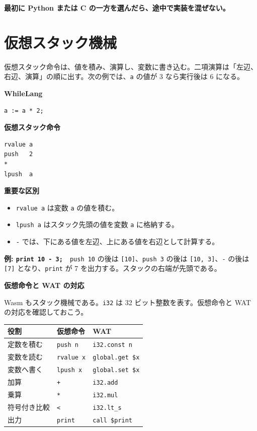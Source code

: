 \documentclass[a4paper,11pt]{ltjsarticle}
\begin{document}
\textbf{最初に Python または C の一方を選んだら、途中で実装を混ぜない。}

\section{仮想スタック機械}

仮想スタック命令は、値を積み、演算し、変数に書き込む。二項演算は「左辺、右辺、演算」の順に出す。次の例では、\texttt{a} の値が 3 なら実行後は 6 になる。

\begin{minipage}[t]{0.47\textwidth}
\textbf{WhileLang}
\begin{lstlisting}
a := a * 2;
\end{lstlisting}
\end{minipage}\hfill
\begin{minipage}[t]{0.49\textwidth}
\textbf{仮想スタック命令}
\begin{lstlisting}
rvalue a
push   2
*
lpush  a
\end{lstlisting}
\end{minipage}

\noindent\textbf{重要な区別}
\begin{itemize}
  \item \texttt{rvalue a} は変数 \texttt{a} の値を積む。
  \item \texttt{lpush a} はスタック先頭の値を変数 \texttt{a} に格納する。
  \item \texttt{-} では、下にある値を左辺、上にある値を右辺として計算する。
\end{itemize}

\noindent\textbf{例: \texttt{print 10 - 3;}}　\texttt{push 10} の後は \texttt{[10]}、\texttt{push 3} の後は \texttt{[10, 3]}、\texttt{-} の後は \texttt{[7]} となり、\texttt{print} が 7 を出力する。スタックの右端が先頭である。

\clearpage
\noindent\textbf{仮想命令と WAT の対応}

Wasm もスタック機械である。\texttt{i32} は 32 ビット整数を表す。仮想命令と WAT の対応を確認しておこう。

\begin{center}
\begin{tabular}{lll}
\toprule
役割 & 仮想命令 & WAT \\
\midrule
定数を積む & \texttt{push n} & \texttt{i32.const n} \\
変数を読む & \texttt{rvalue x} & \texttt{global.get \$x} \\
変数へ書く & \texttt{lpush x} & \texttt{global.set \$x} \\
加算 & \texttt{+} & \texttt{i32.add} \\
乗算 & \texttt{*} & \texttt{i32.mul} \\
符号付き比較 & \texttt{<} & \texttt{i32.lt\_s} \\
出力 & \texttt{print} & \texttt{call \$print} \\
\bottomrule
\end{tabular}
\end{center}
\end{document}
